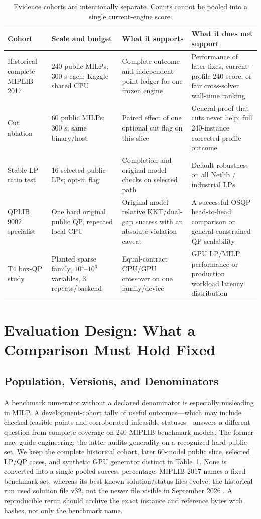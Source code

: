 \documentclass[10pt,a4paper,twocolumn]{article}
\begin{document}
\begin{table}[t]
\centering\small
\caption{Evidence cohorts are intentionally separate. Counts cannot be pooled into a single current-engine score.}
\label{tab:cohorts}
\begin{tabularx}{\textwidth}{@{}p{}p{}p{}X@{}}
\toprule
Cohort & Scale and budget & What it supports & What it does not support\\
\midrule
Historical complete MIPLIB 2017 & 240 public MILPs; 300 s each; Kaggle shared CPU & Complete outcome and independent-point ledger for one frozen engine & Performance of later fixes, current-profile 240 score, or fair cross-solver wall-time ranking\\
Cut ablation & 60 public MILPs; 300 s; same binary/host & Paired effect of one optional cut flag on this slice & General proof that cuts never help; full 240-instance corrected-profile outcome\\
Stable LP ratio test & 16 selected public LPs; opt-in flag & Completion and original-model checks on selected path & Default robustness on all Netlib / industrial LPs\\
QPLIB 9002 specialist & One hard original public QP, repeated local CPU & Original-model relative KKT/dual-gap success with an absolute-violation caveat & A successful OSQP head-to-head comparison or general constrained-QP scalability\\
T4 box-QP study & Planted sparse family, $10^4$--$10^6$ variables, 3 repeats/backend & Equal-contract CPU/GPU crossover on one family/device & GPU LP/MILP performance or production workload latency distribution\\
\bottomrule
\end{tabularx}
\end{table}

\section{Evaluation Design: What a Comparison Must Hold Fixed}

\subsection{Population, Versions, and Denominators}

A benchmark numerator without a declared denominator is especially misleading in MILP. A development-cohort tally of useful outcomes---which may include checked feasible points and corroborated infeasible statuses---answers a different question from complete coverage on 240 MIPLIB benchmark models. The former may guide engineering; the latter audits generality on a recognized hard public set. We keep the complete historical cohort, later 60-model public slice, selected LP/QP cases, and synthetic GPU generator distinct in Table~\ref{tab:cohorts}. None is converted into a single pooled success percentage. MIPLIB 2017 names a fixed benchmark set, whereas its best-known solution/status files evolve; the historical run used solution file v32, not the newer file visible in September 2026 \cite{mip240,miplibdownload}. A reproducible rerun should archive the exact instance and reference bytes with hashes, not only the benchmark name.
\end{document}
